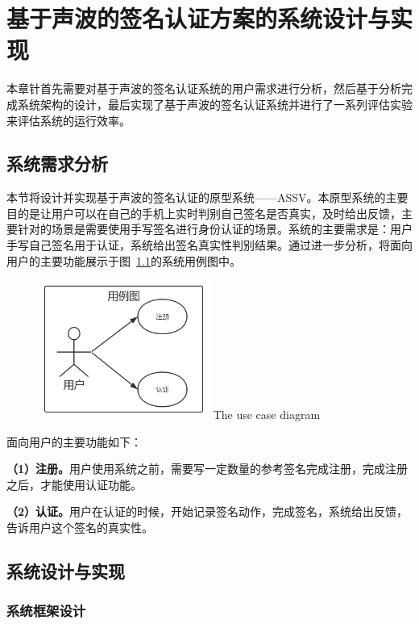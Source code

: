 \chapter{基于声波的签名认证方案的系统设计与实现}

本章针首先需要对基于声波的签名认证系统的用户需求进行分析，然后基于分析完成系统架构的设计，最后实现了基于声波的签名认证系统并进行了一系列评估实验来评估系统的运行效率。

\section{系统需求分析}

本节将设计并实现基于声波的签名认证的原型系统——ASSV。本原型系统的主要目的是让用户可以在自己的手机上实时判别自己签名是否真实，及时给出反馈，主要针对的场景是需要使用手写签名进行身份认证的场景。系统的主要需求是：用户手写自己签名用于认证，系统给出签名真实性判别结果。通过进一步分析，将面向用户的主要功能展示于图~\ref{fig:use-case}的系统用例图中。
\begin{figure}
  \centering
  \includegraphics[width=0.5\textwidth]{figure/use-case.png}
      {The use case diagram}
  \label{fig:use-case}
\end{figure}

面向用户的主要功能如下：

\textbf{（1）注册。}用户使用系统之前，需要写一定数量的参考签名完成注册，完成注册之后，才能使用认证功能。

\textbf{（2）认证。}用户在认证的时候，开始记录签名动作，完成签名，系统给出反馈，告诉用户这个签名的真实性。


\section{系统设计与实现}
\subsection{系统框架设计}

